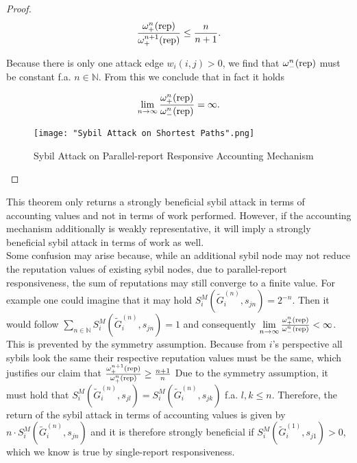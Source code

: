\begin{proof}
\[
\frac{\omega_{+}^n({\rm rep})}{\omega_{+}^{n+1}({\rm rep})}\leq\frac{n}{n+1}.
\]

\noindent{}Because there is only one attack edge $w_i(i,j)>0$, we find that $\omega_{-}^n({\rm rep})$ must be constant f.a. $n\in\mathbb{N}$. From this we conclude that in fact it holds

\[
\lim\limits_{n\rightarrow\infty}\frac{\omega^n_{+}({\rm rep})}{\omega^n_{-}({\rm rep})}=\infty.
\]

\begin{figure}[H]
\begin{center}
\texttt{[image: "Sybil Attack on Shortest Paths".png]}
\caption{Sybil Attack on Parallel-report Responsive Accounting Mechanism}
\label{fig:Parallel Sybil Attack}
\end{center}
\end{figure}
\end{proof}

\noindent{}This theorem only returns a strongly beneficial sybil attack in terms of accounting values and not in terms of work performed. However, if the accounting mechanism additionally is weakly representative, it will imply a strongly beneficial sybil attack in terms of work as well.\vspace{1em}\\


\noindent{}Some confusion may arise because, while an additional sybil node may not reduce the reputation values of existing sybil nodes, due to parallel-report responsiveness, the sum of reputations may still converge to a finite value. For example one could imagine that it may hold $S^M_i(\tilde{G}^{(n)}_i,s_{jn})=2^{-n}$. Then it would follow $\sum\limits_{n\in\mathbb{N}}S^M_i(\tilde{G}_i^{(n)},s_{jn})=1$ and consequently $\lim\limits_{n\rightarrow\infty}\frac{\omega^n_{+}({\rm rep})}{\omega^n_{-}({\rm rep})}<\infty$. This is prevented by the symmetry assumption. Because from $i$'s perspective all sybils look the same their respective reputation values must be the same, which justifies our claim that $\frac{\omega_{+}^{n+1}({\rm rep})}{\omega_{+}^n({\rm rep})}\geq\frac{n+1}{n}$ Due to the symmetry assumption, it must hold that $S^M_i(\tilde{G}_i^{(n)},s_{jl})=S^M_i(\tilde{G}_i^{(n)},s_{jk})$ f.a. $l,k\leq{}n$. Therefore, the return of the sybil attack in terms of accounting values is given by $n\cdot{}S^M_i(\tilde{G}_i^{(n)},s_{jn})$ and it is therefore strongly beneficial if $S^M_i(\tilde{G}_i^{(1)},s_{j1})>0$, which we know is true by single-report responsiveness. \vspace{1em}\\ 

